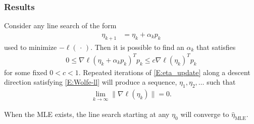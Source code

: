 \documentclass[ 10pt]{beamer}
\newcommand{\fatdot}{\,\cdot\,}
\newcommand{\etaMLE}{\hat{\eta}_{\textrm{MLE}}}
\begin{document}
\frame
{
\frametitle{Results}
{\small

\begin{theorem} \label{Thm:log like max}
Consider any line search of the form 
\begin{align}
	\eta_{k+1} &= \eta_k + \alpha_k p_k \label{E:eta_update}
\end{align}
used to minimize $-\ell(\fatdot)$. %
Then it is possible to find an $\alpha_k$ that satisfies %
\begin{align}
	0 \leq \nabla \ell( \eta_k + \alpha_k p_k)^T p_k  \leq c \nabla \ell(\eta_k)^T p_k  
\label{E:Wolfe-ll}
\end{align}
for some fixed $0 < c < 1$.
Repeated iterations of \eqref{E:eta_update} along a descent direction 
satisfying \eqref{E:Wolfe-ll} will produce a sequence, $\eta_1, \eta_2, \ldots$ such 
that
\begin{align*}
	\lim_{k \to \infty} \lVert \nabla \ell(\eta_k) \rVert = 0.
\end{align*}
\end{theorem}
\begin{theorem} \label{Thm:Line Search works}
When the MLE exists, the 
line search starting at any $\eta_0$ will converge to $\etaMLE$.
\end{theorem}
}

}
%
%
%
%
%
\end{document}

